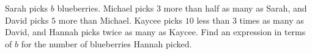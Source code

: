 Sarah picks $b$ blueberries. Michael picks $3$ more than half as many as Sarah, and David picks $5$ more than Michael. Kaycee picks $10$ less than $3$ times as many as David, and Hannah picks twice as many as Kaycee. Find an expression in terms of $b$ for the number of blueberries Hannah picked.
